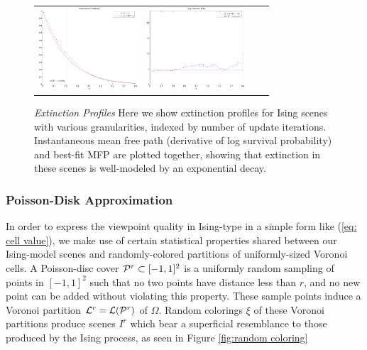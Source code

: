 \begin{figure}
\begin{tabular}{cccc}
\includegraphics[height=1.2in]{Penetration/ising_penetration_025} &
\includegraphics[height=1.2in]{Penetration/ising_extinction_025}
\end{tabular}
\caption{\emph{Extinction Profiles} \label{fig: MFP}
Here we show extinction profiles for Ising scenes with various granularities, indexed by number of update iterations.
Instantaneous mean free path (derivative of log survival probability) and best-fit MFP are plotted together,
showing that extinction in these scenes is well-modeled by an exponential decay.
}
\end{figure}

\subsubsection{Poisson-Disk Approximation}

In order to express the viewpoint quality in
Ising-type in a simple form like (\ref{eq: cell value}),
we make use of
certain statistical properties
shared between our Ising-model scenes 
and randomly-colored partitions of uniformly-sized Voronoi cells.
A Poisson-disc cover $\mathcal{P}^r\subset[-1,1]^2$ is a uniformly
random sampling of points in $[-1,1]^2$ such that 
no two points have distance less than $r$, and no
new point can be added without violating this property.
These sample points induce a Voronoi partition $\mathcal{L}^r=\mathcal{L}(\mathcal{P}^r)$ of $\Omega$.
Random colorings $\xi$ of these Voronoi partitions produce scenes $I^r$
which bear a superficial resemblance to those produced by the Ising
process, as seen in Figure \ref{fig:random coloring}

